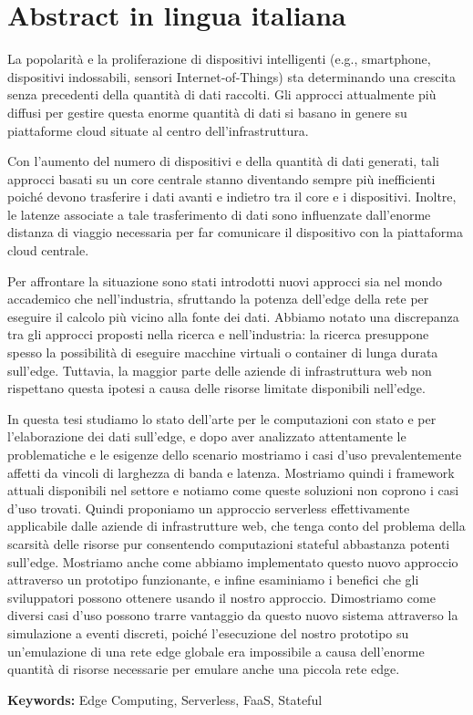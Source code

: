 \chapter*{Abstract in lingua italiana}

La popolarità e la proliferazione di dispositivi intelligenti (e.g., smartphone, dispositivi indossabili, sensori Internet-of-Things) sta determinando una crescita senza precedenti della quantità di dati raccolti. Gli approcci attualmente più diffusi per gestire questa enorme quantità di dati si basano in genere su piattaforme cloud situate al centro dell'infrastruttura.

Con l'aumento del numero di dispositivi e della quantità di dati generati, tali approcci basati su un core centrale stanno diventando sempre più inefficienti poiché devono trasferire i dati avanti e indietro tra il core e i dispositivi. Inoltre, le latenze associate a tale trasferimento di dati sono influenzate dall'enorme distanza di viaggio necessaria per far comunicare il dispositivo con la piattaforma cloud centrale.

Per affrontare la situazione sono stati introdotti nuovi approcci sia nel mondo accademico che nell'industria, sfruttando la potenza dell'edge della rete per eseguire il calcolo più vicino alla fonte dei dati. Abbiamo notato una discrepanza tra gli approcci proposti nella ricerca e nell'industria: la ricerca presuppone spesso la possibilità di eseguire macchine virtuali o container di lunga durata sull'edge. Tuttavia, la maggior parte delle aziende di infrastruttura web non rispettano questa ipotesi a causa delle risorse limitate disponibili nell'edge.

In questa tesi studiamo lo stato dell'arte per le computazioni con stato e per l'elaborazione dei dati sull'edge, e dopo aver analizzato attentamente le problematiche e le esigenze dello scenario mostriamo i casi d'uso prevalentemente affetti da vincoli di larghezza di banda e latenza. Mostriamo quindi i framework attuali disponibili nel settore e notiamo come queste soluzioni non coprono i casi d'uso trovati. Quindi proponiamo un approccio serverless effettivamente applicabile dalle aziende di infrastrutture web, che tenga conto del problema della scarsità delle risorse pur consentendo computazioni stateful abbastanza potenti sull'edge. Mostriamo anche come abbiamo implementato questo nuovo approccio attraverso un prototipo funzionante, e infine esaminiamo i benefici che gli sviluppatori possono ottenere usando il nostro approccio. Dimostriamo come diversi casi d'uso possono trarre vantaggio da questo nuovo sistema attraverso la simulazione a eventi discreti, poiché l'esecuzione del nostro prototipo su un'emulazione di una rete edge globale era impossibile a causa dell'enorme quantità di risorse necessarie per emulare anche una piccola rete edge.

\textbf{Keywords:} Edge Computing, Serverless, FaaS, Stateful


